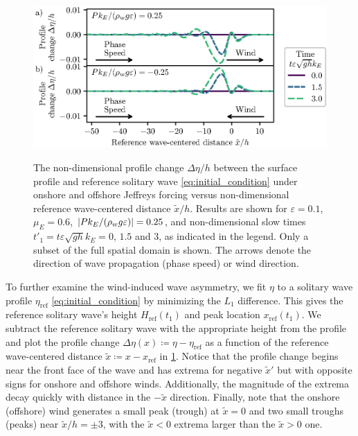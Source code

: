 \documentclass{jfm}
\renewcommand*{\epsilon}{\varepsilon}
\begin{document}
\begin{figure}
  \centering
  { %
    \label{fig:snapshots_solitary_tail:a}
    \label{fig:snapshots_solitary_tail:b}
  }
  \includegraphics{Snapshots-Positive-Negative-Tail.eps}
  \caption{
    The non-dimensional profile change $\Delta \eta/h$ between the
    surface profile and reference solitary wave
    \cref{eq:initial_condition} under
     onshore and
     offshore Jeffreys forcing
    versus non-dimensional reference wave-centered distance
    $\tilde{x}/h$.
    Results are shown for $\epsilon=0.1$, $\mu_E = 0.6$, $\abs{P
    k_E/(\rho_w g \epsilon)} = 0.25$, and non-dimensional slow times
    $t'_1 = t \epsilon \sqrt{gh} k_E = 0$, $1.5$ and $3$, as indicated
    in the legend.
    Only a subset of the full spatial domain is shown.
    The arrows denote the direction of wave propagation (phase speed) or
    wind direction.
  }\label{fig:snapshots_solitary_tail}
\end{figure}

To further examine the wind-induced wave asymmetry, we fit $\eta$ to a
solitary wave profile $\eta_{\text{ref}}$ \cref{eq:initial_condition} by
minimizing the $L_1$ difference.
This gives the reference solitary wave's height $H_{\text{ref}}(t_1)$
and peak location $x_{\text{ref}}(t_1)$.
We subtract the reference solitary wave with the appropriate height from
the profile and plot the profile change $\Delta \eta(x) \coloneqq \eta -
\eta_{\text{ref}}$ as a function of the reference wave-centered distance
$\tilde{x} \coloneqq x - x_{\text{ref}}$ in
\cref{fig:snapshots_solitary_tail}.
Notice that the profile change begins near the front face of the wave
and has extrema for negative $\tilde{x}'$ but with opposite signs for
onshore and offshore winds.
Additionally, the magnitude of the extrema decay quickly with distance
in the $-\tilde{x}$ direction.
Finally, note that the onshore (offshore) wind generates a small peak
(trough) at $\tilde{x} = 0$ and two small troughs (peaks) near
$\tilde{x}/h = \pm 3$, with the $\tilde{x}<0$ extrema larger than the
$\tilde{x}>0$ one.
\end{document}
